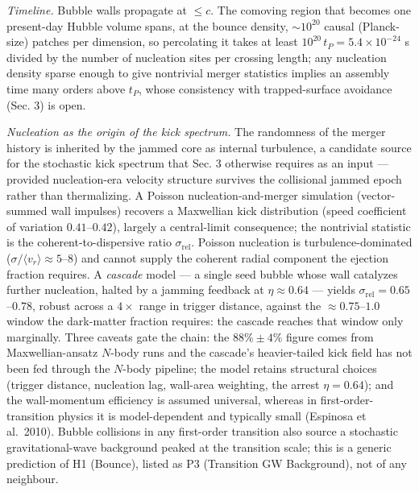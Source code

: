\documentclass[
]{article}
\begin{document}
\emph{Timeline.} Bubble walls propagate at \(\leq c\). The comoving
region that becomes one present-day Hubble volume spans, at the bounce
density, \(\sim\!10^{20}\) causal (Planck-size) patches per dimension,
so percolating it takes at least \(10^{20}\,t_P = 5.4\times10^{-24}\) s
divided by the number of nucleation sites per crossing length; any
nucleation density sparse enough to give nontrivial merger statistics
implies an assembly time many orders above \(t_P\), whose consistency
with trapped-surface avoidance (Sec. 3) is open.

\emph{Nucleation as the origin of the kick spectrum.} The randomness of
the merger history is inherited by the jammed core as internal
turbulence, a candidate source for the stochastic kick spectrum that
Sec. 3 otherwise requires as an input --- provided nucleation-era
velocity structure survives the collisional jammed epoch rather than
thermalizing. A Poisson nucleation-and-merger simulation (vector-summed
wall impulses) recovers a Maxwellian kick distribution (speed
coefficient of variation \(0.41\)--\(0.42\)), largely a central-limit
consequence; the nontrivial statistic is the coherent-to-dispersive
ratio \(\sigma_{\text{rel}}\). Poisson nucleation is
turbulence-dominated (\(\sigma/\langle v_r\rangle \approx 5\)--\(8\))
and cannot supply the coherent radial component the ejection fraction
requires. A \emph{cascade} model --- a single seed bubble whose wall
catalyzes further nucleation, halted by a jamming feedback at
\(\eta \approx 0.64\) --- yields
\(\sigma_{\text{rel}} = 0.65\)--\(0.78\), robust across a \(4\times\)
range in trigger distance, against the \(\approx 0.75\)--\(1.0\) window
the dark-matter fraction requires: the cascade reaches that window only
marginally. Three caveats gate the chain: the \(88\% \pm 4\%\) figure
comes from Maxwellian-ansatz \(N\)-body runs and the cascade's
heavier-tailed kick field has not been fed through the \(N\)-body
pipeline; the model retains structural choices (trigger distance,
nucleation lag, wall-area weighting, the arrest \(\eta = 0.64\)); and
the wall-momentum efficiency is assumed universal, whereas in
first-order-transition physics it is model-dependent and typically small
(Espinosa et al.~2010). Bubble collisions in any first-order transition
also source a stochastic gravitational-wave background peaked at the
transition scale; this is a generic prediction of H1 (Bounce), listed as
P3 (Transition GW Background), not of any neighbour.
\end{document}

